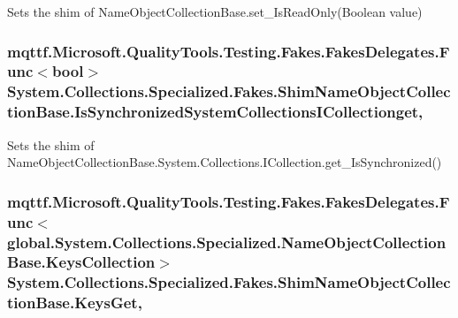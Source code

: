 Sets the shim of Name\-Object\-Collection\-Base.\-set\-\_\-\-Is\-Read\-Only(\-Boolean value)

\hypertarget{class_system_1_1_collections_1_1_specialized_1_1_fakes_1_1_shim_name_object_collection_base_a7ce84450496354166df077b351a1d0fe}{
\subsubsection[{Is\-Synchronized\-System\-Collections\-I\-Collectionget}]{\setlength{\rightskip}{0pt plus 5cm}mqttf.\-Microsoft.\-Quality\-Tools.\-Testing.\-Fakes.\-Fakes\-Delegates.\-Func$<$bool$>$ System.\-Collections.\-Specialized.\-Fakes.\-Shim\-Name\-Object\-Collection\-Base.\-Is\-Synchronized\-System\-Collections\-I\-Collectionget\hspace{0.3cm}{\ttfamily [get]}, {\ttfamily [set]}}}\label{class_system_1_1_collections_1_1_specialized_1_1_fakes_1_1_shim_name_object_collection_base_a7ce84450496354166df077b351a1d0fe}


Sets the shim of Name\-Object\-Collection\-Base.\-System.\-Collections.\-I\-Collection.\-get\-\_\-\-Is\-Synchronized()

\hypertarget{class_system_1_1_collections_1_1_specialized_1_1_fakes_1_1_shim_name_object_collection_base_a3183ab3cd69d15f0c9a31e26f8d69a53}{
\subsubsection[{Keys\-Get}]{\setlength{\rightskip}{0pt plus 5cm}mqttf.\-Microsoft.\-Quality\-Tools.\-Testing.\-Fakes.\-Fakes\-Delegates.\-Func$<$global.\-System.\-Collections.\-Specialized.\-Name\-Object\-Collection\-Base.\-Keys\-Collection$>$ System.\-Collections.\-Specialized.\-Fakes.\-Shim\-Name\-Object\-Collection\-Base.\-Keys\-Get\hspace{0.3cm}{\ttfamily [get]}, {\ttfamily [set]}}}\label{class_system_1_1_collections_1_1_specialized_1_1_fakes_1_1_shim_name_object_collection_base_a3183ab3cd69d15f0c9a31e26f8d69a53}


